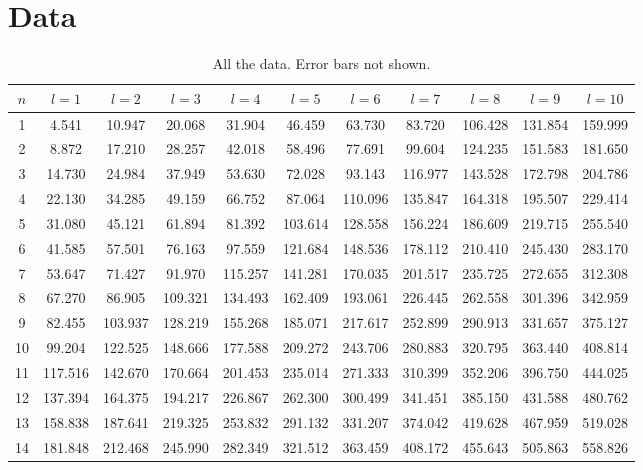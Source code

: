 \documentclass[12pt,twoside]{reedthesis}
\begin{document}
\chapter{Data}
\begin{table}[h]
\begin{adjustwidth}{-0.5in}{-0.5in}
	\caption{All the data. Error bars not shown.}
	\label{tab:alldata}
	\begin{tabular}{c|cccccccccc}
		$n$	& $l = 1$	& $l = 2$	& $l = 3$	& $l = 4$	& $l = 5$	& $l = 6$	& $l = 7$	& $l = 8$	& $l = 9$	& $l = 10$\\
		\hline
		1	& 4.541	& 10.947	& 20.068	& 31.904	& 46.459	& 63.730	& 83.720	& 106.428	& 131.854	& 159.999\\
		2	& 8.872	& 17.210	& 28.257	& 42.018	& 58.496	& 77.691	& 99.604	& 124.235	& 151.583	& 181.650\\
		3	& 14.730	& 24.984	& 37.949	& 53.630	& 72.028	& 93.143	& 116.977	& 143.528	& 172.798	& 204.786\\
		4	& 22.130	& 34.285	& 49.159	& 66.752	& 87.064	& 110.096	& 135.847	& 164.318	& 195.507	& 229.414\\
		5	& 31.080	& 45.121	& 61.894	& 81.392	& 103.614	& 128.558	& 156.224	& 186.609	& 219.715	& 255.540\\
		6	& 41.585	& 57.501	& 76.163	& 97.559	& 121.684	& 148.536	& 178.112	& 210.410	& 245.430	& 283.170\\
		7	& 53.647	& 71.427	& 91.970	& 115.257	& 141.281	& 170.035	& 201.517	& 235.725	& 272.655	& 312.308\\
		8	& 67.270	& 86.905	& 109.321	& 134.493	& 162.409	& 193.061	& 226.445	& 262.558	& 301.396	& 342.959\\
		9	& 82.455	& 103.937	& 128.219	& 155.268	& 185.071	& 217.617	& 252.899	& 290.913	& 331.657	& 375.127\\
		10	& 99.204	& 122.525	& 148.666	& 177.588	& 209.272	& 243.706	& 280.883	& 320.795	& 363.440	& 408.814\\
		11	& 117.516	& 142.670	& 170.664	& 201.453	& 235.014	& 271.333	& 310.399	& 352.206	& 396.750	& 444.025\\
		12	& 137.394	& 164.375	& 194.217	& 226.867	& 262.300	& 300.499	& 341.451	& 385.150	& 431.588	& 480.762\\
		13	& 158.838	& 187.641	& 219.325	& 253.832	& 291.132	& 331.207	& 374.042	& 419.628	& 467.959	& 519.028\\
		14	& 181.848	& 212.468	& 245.990	& 282.349	& 321.512	& 363.459	& 408.172	& 455.643	& 505.863	& 558.826\\

\end{tabular}
\end{adjustwidth}
\end{table}
\end{document}
